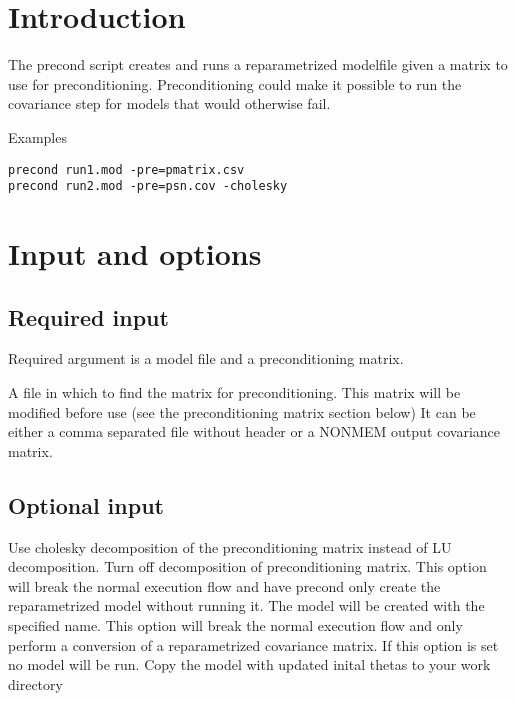 



\maketitle


\section{Introduction}
The precond script creates and runs a reparametrized modelfile given a matrix to use for preconditioning.
Preconditioning could make it possible to run the covariance step for models that would otherwise fail.

Examples
\begin{verbatim}
precond run1.mod -pre=pmatrix.csv
precond run2.mod -pre=psn.cov -cholesky
\end{verbatim}

\section{Input and options}

\subsection{Required input}
Required argument is a model file and a preconditioning matrix.

\begin{optionlist}

A file in which to find the matrix for preconditioning. This matrix will be modified before use (see the preconditioning matrix section below) It can be either a comma separated file without header or a NONMEM output covariance matrix.
\nextopt
\end{optionlist}

\subsection{Optional input}

\begin{optionlist}
Use cholesky decomposition of the preconditioning matrix instead of LU decomposition.
Turn off decomposition of preconditioning matrix.
This option will break the normal execution flow and have precond only create the reparametrized model without running it.
The model will be created with the specified name.
This option will break the normal execution flow and only perform a conversion of a reparametrized covariance matrix.
If this option is set no model will be run.
Copy the model with updated inital thetas to your work directory
\end{optionlist}

